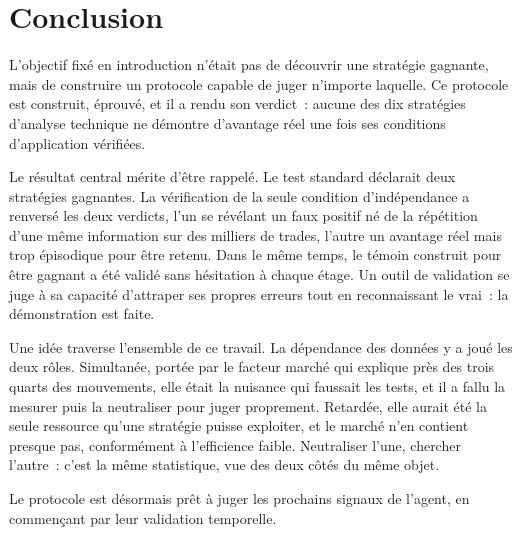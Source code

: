 \chapter{Conclusion}
\label{chap:conclusion}

L'objectif fixé en introduction n'était pas de découvrir une stratégie
gagnante, mais de construire un protocole capable de juger n'importe
laquelle. Ce protocole est construit, éprouvé, et il a rendu son
verdict~: aucune des dix stratégies d'analyse technique ne démontre
d'avantage réel une fois ses conditions d'application vérifiées.

Le résultat central mérite d'être rappelé. Le test standard déclarait
deux stratégies gagnantes. La vérification de la seule condition
d'indépendance a renversé les deux verdicts, l'un se révélant un faux
positif né de la répétition d'une même information sur des milliers de
trades, l'autre un avantage réel mais trop épisodique pour être retenu.
Dans le même temps, le témoin construit pour être gagnant a été validé
sans hésitation à chaque étage. Un outil de validation se juge à sa
capacité d'attraper ses propres erreurs tout en reconnaissant le vrai~:
la démonstration est faite.

Une idée traverse l'ensemble de ce travail. La dépendance des données y
a joué les deux rôles. Simultanée, portée par le facteur marché qui
explique près des trois quarts des mouvements, elle était la nuisance
qui faussait les tests, et il a fallu la mesurer puis la neutraliser
pour juger proprement. Retardée, elle aurait été la seule ressource
qu'une stratégie puisse exploiter, et le marché n'en contient presque
pas, conformément à l'efficience faible. Neutraliser l'une, chercher
l'autre~: c'est la même statistique, vue des deux côtés du même objet.

Le protocole est désormais prêt à juger les prochains signaux de
l'agent, en commençant par leur validation temporelle.
